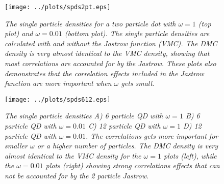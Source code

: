 \documentclass[a4paper,10pt,twocolumn]{article} %
\begin{document}
\begin{figure}[h!]
\begin{center}
\caption{{\it%
		The single particle densities for a two particle dot with $\omega=1$ (top plot) and $\omega=0.01$ (bottom plot). 
		The single particle densities are calculated with and without the Jastrow function (VMC). The DMC density is very almost identical to the VMC density, showing that most 
		correlations are accounted for by the Jastrow. These plots also demonstrates that the correlation effects 
		included in the Jastrow function are more important when $\omega$ gets small. 
		}}
		\label{fig:spd2}
\vspace{.1cm}
	\texttt{[image: ../plots/spds2pt.eps]}
\end{center}
\end{figure}

\begin{figure*}[ht!]
\begin{center}
	\texttt{[image: ../plots/spds612.eps]}
\caption{{\it%
		The single particle densities A) 6 particle QD with $\omega=1$ B) 6 particle QD with $\omega=0.01$  C) 12 particle QD with $\omega=1$ D) 12 particle QD with $\omega=0.01$. 
		The correlations gets more important for smaller $\omega$ or a higher number of particles. 		 
		The DMC density is very almost identical to the VMC density for the $\omega=1$ plots (left), while the $\omega=0.01$ plots (right) 
		showing strong correlations effects that can not be accounted for by the 2 particle Jastrow. 
		}}
		\label{fig:spd612}
\vspace{.1cm}
\end{center}
\end{figure*}


\end{document}
